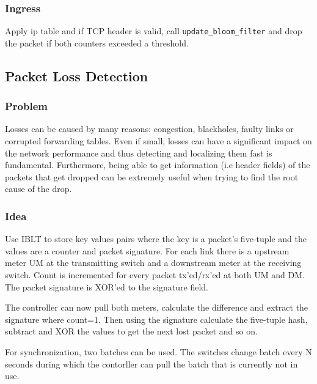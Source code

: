 \documentclass[a4paper, fontsize=8pt, landscape, DIV=1]{scrartcl}
\begin{document}
\begin{multicols*}{4}
  \subsubsection{Ingress} 
  Apply ip table and if TCP header is valid, call \texttt{update\_bloom\_filter} and drop the
  packet if both counters exceeded a threshold.


  \subsection{Packet Loss Detection}
  \subsubsection{Problem}
  Losses can be caused by many reasons: congestion, blackholes, faulty links or corrupted
  forwarding tables. Even if small, losses can have a significant impact on the network 
  performance and thus detecting and localizing them fast is fundamental. Furthermore, being 
  able to get information (i.e header fields) of the packets that get dropped can be 
  extremely useful when trying to find the root cause of the drop.

  \subsubsection{Idea}
  Use IBLT to store key values pairs where the key is a packet's five-tuple and the values are
  a counter and packet signature. For each link there is a upstream meter UM at the transmitting
  switch and a downstream meter at the receiving switch. Count is incremented for every packet
  tx'ed/rx'ed at both UM and DM. The packet signature is XOR'ed to the signature field. 

  The controller can now pull both meters, calculate the difference and extract the signature
  where count=1. Then using the signature calculate the five-tuple hash, subtract and XOR
  the values to get the next lost packet and so on.

  For synchronization, two batches can be used. The switches change batch every N seconds
  during which the contorller can pull the batch that is currently not in use.
    

  \vfill\null
  \pagebreak
  \end{multicols*}
\end{document}
